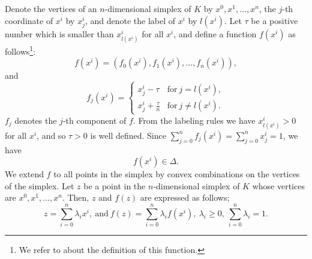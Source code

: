 \documentclass[reqno]{amsart}
\begin{document}
Denote the vertices of an $n$-dimensional simplex of $K$ by $x^0, x^1, \dots, x^n$, the $j$-th coordinate of $x^i$ by $x^i_j$, and denote the label of $x^i$ by $l(x^i)$. Let $\tau$ be a positive number which is smaller than $x^i_{l(x^i)}$ for all $x^i$, and define a function $f(x^i)$ as follows\footnote{We refer to \cite{yoseloff} about the definition of this function.}:
\[f(x^i)=(f_0(x^i), f_1(x^i), \dots, f_n(x^i)),\]
and
\begin{equation}
f_j(x^i)=\left\{
\begin{array}{ll}
x^i_j-\tau&\mathrm{for}\ j=l(x^i),\\
x^i_j+\frac{\tau}{n}&\mathrm{for}\ j\neq l(x^i).\label{e0}
\end{array}
\right.
\end{equation}
$f_j$ denotes the $j$-th component of $f$. From the labeling rules we have $x^i_{l(x^i)}>0$ for all $x^i$, and so $\tau>0$ is well defined. Since $\sum_{j=0}^nf_j(x^i)=\sum_{j=0}^nx^i_j=1$, we have
\[f(x^i)\in \Delta.\]
We extend $f$ to all points in the simplex by convex combinations on the vertices of the simplex. Let $z$ be a point in the $n$-dimensional simplex of $K$ whose vertices are $x^0, x^1, \dots, x^n$. Then, $z$ and $f(z)$ are expressed as follows;
\[z=\sum_{i=0}^n\lambda_ix^i,\ \mathrm{and}\ f(z)=\sum_{i=0}^n\lambda_if(x^i),\ \lambda_i\geq 0,\ \sum_{i=0}^n\lambda_i=1.\]
\end{document}
